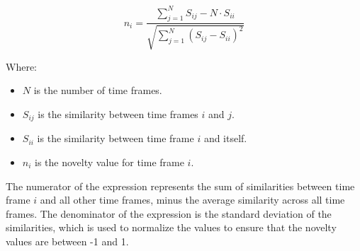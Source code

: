 \begin{equation}
n_i = \frac{\sum\limits_{j=1}^{N} S_{ij} - N\cdot S_{ii}}{\sqrt{\sum\limits_{j=1}^{N} (S_{ij} - S_{ii})^2}}
\end{equation}

Where:
\begin{itemize}
\item $N$ is the number of time frames.
\item $S_{ij}$ is the similarity between time frames $i$ and $j$.
\item $S_{ii}$ is the similarity between time frame $i$ and itself.
\item $n_i$ is the novelty value for time frame $i$.
\end{itemize}

The numerator of the expression represents the sum of similarities between time frame $i$ and all other time frames, minus the average similarity across all time frames. The denominator of the expression is the standard deviation of the similarities, which is used to normalize the values to ensure that the novelty values are between -1 and 1.
